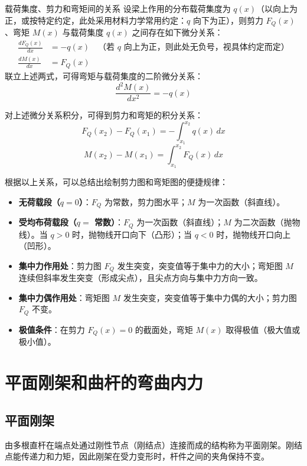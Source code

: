 \begin{myTheorem}{载荷集度、剪力和弯矩间的关系}
    设梁上作用的分布载荷集度为 \(q(x)\)（以向上为正，或按特定约定，此处采用材料力学常用约定：\(q\) 向下为正），则剪力 \(F_Q(x)\)、弯矩 \(M(x)\) 与载荷集度 \(q(x)\) 之间存在如下微分关系：
    \begin{align}
        \frac{dF_Q(x)}{dx} &= -q(x) \quad \text{（若 \(q\) 向上为正，则此处无负号，视具体约定而定）} \\
        \frac{dM(x)}{dx} &= F_Q(x)
    \end{align}
    联立上述两式，可得弯矩与载荷集度的二阶微分关系：
    \[ \frac{d^2M(x)}{dx^2} = -q(x) \]

    对上述微分关系积分，可得到剪力和弯矩的积分关系：
    \[ F_Q(x_2) - F_Q(x_1) = -\int_{x_1}^{x_2} q(x) \, dx \]
    \[ M(x_2) - M(x_1) = \int_{x_1}^{x_2} F_Q(x) \, dx \]

    根据以上关系，可以总结出绘制剪力图和弯矩图的便捷规律：
    \begin{itemize}
        \item \textbf{无荷载段（\(q=0\)）}：\(F_Q\) 为常数，剪力图水平；\(M\) 为一次函数（斜直线）。
        \item \textbf{受均布荷载段（\(q=\) 常数）}：\(F_Q\) 为一次函数（斜直线）；\(M\) 为二次函数（抛物线）。当 \(q>0\) 时，抛物线开口向下（凸形）；当 \(q<0\) 时，抛物线开口向上（凹形）。
        \item \textbf{集中力作用处}：剪力图 \(F_Q\) 发生突变，突变值等于集中力的大小；弯矩图 \(M\) 连续但斜率发生突变（形成尖点），且尖点方向与集中力方向一致。
        \item \textbf{集中力偶作用处}：弯矩图 \(M\) 发生突变，突变值等于集中力偶的大小；剪力图 \(F_Q\) 不变。
        \item \textbf{极值条件}：在剪力 \(F_Q(x)=0\) 的截面处，弯矩 \(M(x)\) 取得极值（极大值或极小值）。
    \end{itemize}
\end{myTheorem}

\section{平面刚架和曲杆的弯曲内力}

\subsection*{平面刚架}
由多根直杆在端点处通过刚性节点（刚结点）连接而成的结构称为平面刚架。刚结点能传递力和力矩，因此刚架在受力变形时，杆件之间的夹角保持不变。

